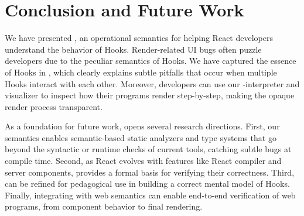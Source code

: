 \chapter{Conclusion and Future Work}\label{chap:conclusion}
We have presented \Rtrace{}, an operational semantics for helping React developers understand the behavior of Hooks.
Render-related UI bugs often puzzle developers due to the peculiar semantics of Hooks.
We have captured the essence of Hooks in \Rtrace{}, which clearly explains subtle pitfalls that occur when multiple Hooks interact with each other.
Moreover, developers can use our \Rtrace-interpreter and visualizer to inspect how their programs render step-by-step, making the opaque render process transparent.

As a foundation for future work, \Rtrace{} opens several research directions.
First, our semantics enables semantic-based static analyzers and type systems that go beyond the syntactic or runtime checks of current tools, catching subtle bugs at compile time.
Second, as React evolves with features like React compiler and server components, \Rtrace{} provides a formal basis for verifying their correctness.
Third, \Rtrace{} can be refined for pedagogical use in building a correct mental model of Hooks.
Finally, integrating \Rtrace{} with web semantics can enable end-to-end verification of web programs, from component behavior to final rendering.
